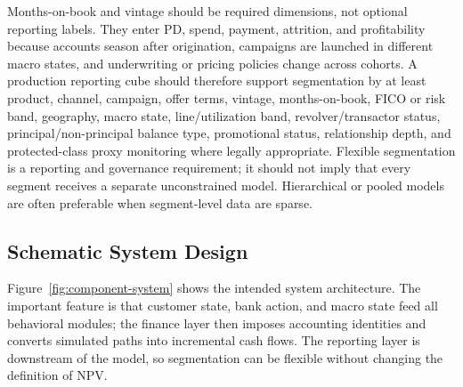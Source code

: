 \documentclass[11pt]{article}
\newcommand{\1}{\mathbf{1}}
\begin{document}
Months-on-book and vintage should be required dimensions, not optional
reporting labels. They enter PD, spend, payment, attrition, and profitability
because accounts season after origination, campaigns are launched in different
macro states, and underwriting or pricing policies change across cohorts. A
production reporting cube should therefore support segmentation by at least
product, channel, campaign, offer terms, vintage, months-on-book, FICO or risk
band, geography, macro state, line/utilization band, revolver/transactor
status, principal/non-principal balance type, promotional status, relationship
depth, and protected-class proxy monitoring where legally appropriate. Flexible
segmentation is a reporting and governance requirement; it should not imply
that every segment receives a separate unconstrained model. Hierarchical or
pooled models are often preferable when segment-level data are sparse.

\subsection{Schematic System Design}
\label{subsec:schematic}

Figure~\ref{fig:component-system} shows the intended system architecture. The
important feature is that customer state, bank action, and macro state feed all
behavioral modules; the finance layer then imposes accounting identities and
converts simulated paths into incremental cash flows. The reporting layer is
downstream of the model, so segmentation can be flexible without changing the
definition of NPV.
\end{document}
